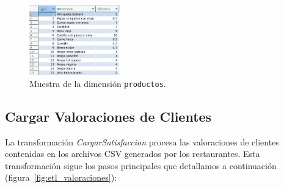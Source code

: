 \documentclass[11pt]{opticajnl}
\begin{document}
\begin{figure}[H]
    \centering
    \includegraphics[width=0.35\textwidth]{fotos/dim_productos.jpg}
    \caption{Muestra de la dimensión \texttt{productos}.}
    \label{fig:dim3}
\end{figure}

\subsection{Cargar Valoraciones de Clientes}

La transformación \textit{CargarSatisfaccion} procesa las valoraciones de clientes contenidas en los archivos CSV generados por los restaurantes. Esta transformación sigue los pasos principales que detallamos a continuación (figura~\ref{fig:etl_valoraciones}):
\end{document}
